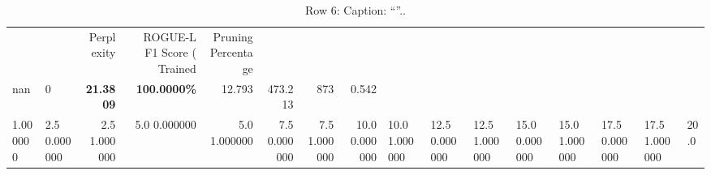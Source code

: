 \begin{table}
\caption{Row 6\ifshowcaption{}: Caption: ``''.\else.\fi}
\label{tab:evaluation-pipeline-6}
\begin{tabular}{llrrrrrr}
 &  & Perplexity & ROGUE-L F1 Score (%
Trained & Pruning Percentage &  &  &  &  &  &  \\
nan & 0 & \bfseries 21.3809 & \bfseries 100.0000\% & 12.793 & 473.213 & 873 & 0.542 \\
1.000000 & 2.5%
0.000000 & 2.5%
1.000000 & 5.0%
0.000000 & 5.0%
1.000000 & 7.5%
0.000000 & 7.5%
1.000000 & 10.0%
0.000000 & 10.0%
1.000000 & 12.5%
0.000000 & 12.5%
1.000000 & 15.0%
0.000000 & 15.0%
1.000000 & 17.5%
0.000000 & 17.5%
1.000000 & 20.0%

\end{tabular}
\end{table}
